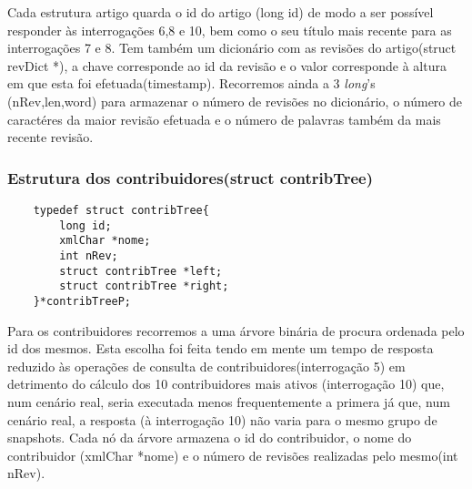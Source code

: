 \documentclass{report}
\begin{document}
Cada estrutura artigo quarda o id do artigo (long id) de modo a ser possível responder às interrogações 6,8 e 10, bem como o seu título mais recente para as interrogações 7 e 8. Tem também um dicionário com as revisões do artigo(struct revDict *), a chave corresponde ao id da revisão e o valor corresponde à altura em que esta foi efetuada(timestamp). Recorremos ainda a 3 \textit{long}'s (nRev,len,word) para armazenar o número de revisões no dicionário, o número de caractéres da maior revisão efetuada e o número de palavras também da mais recente revisão.	

\subsubsection{Estrutura dos contribuidores(struct contribTree)}
\begin{verbatim}
    typedef struct contribTree{
        long id;
        xmlChar *nome;
        int nRev;
        struct contribTree *left;
        struct contribTree *right;
    }*contribTreeP;
\end{verbatim}


Para os contribuidores recorremos a uma árvore binária de procura ordenada pelo id dos mesmos. Esta escolha foi feita tendo em mente um tempo de resposta reduzido às operações de consulta de contribuidores(interrogação 5) em detrimento do cálculo dos 10 contribuidores mais ativos (interrogação 10) que, num cenário real, seria executada menos frequentemente a primera já que, num cenário real, a resposta (à interrogação 10) não varia para o mesmo grupo de snapshots. Cada nó da árvore armazena o id do contribuidor, o nome do contribuidor (xmlChar *nome) e o número de revisões realizadas pelo mesmo(int nRev).
\end{document}
